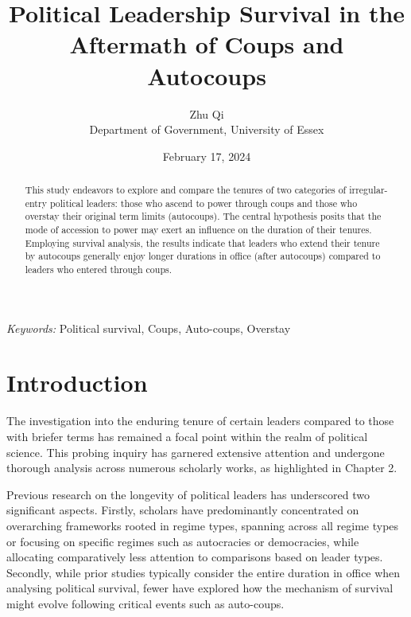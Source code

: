 \documentclass[
  12pt,
  a4paper,
  12pt]{article}
\begin{document}
\def\spacingset#1{\renewcommand{\baselinestretch}%
{#1}\small\normalsize} \spacingset{1}



\date{February 17, 2024}
\title{\bf Political Leadership Survival in the Aftermath of Coups and
Autocoups}
\author{
Zhu Qi\\
Department of Government, University of Essex\\
}
\maketitle

\bigskip
\bigskip
\begin{abstract}
This study endeavors to explore and compare the tenures of two
categories of irregular-entry political leaders: those who ascend to
power through coups and those who overstay their original term limits
(autocoups). The central hypothesis posits that the mode of accession to
power may exert an influence on the duration of their tenures. Employing
survival analysis, the results indicate that leaders who extend their
tenure by autocoups generally enjoy longer durations in office (after
autocoups) compared to leaders who entered through coups.
\end{abstract}

\noindent%
{\it Keywords:} Political survival, Coups, Auto-coups, Overstay
\vfill

\newpage
\spacingset{1.9} %

\section{Introduction}\label{introduction}

The investigation into the enduring tenure of certain leaders compared
to those with briefer terms has remained a focal point within the realm
of political science. This probing inquiry has garnered extensive
attention and undergone thorough analysis across numerous scholarly
works, as highlighted in Chapter 2.

Previous research on the longevity of political leaders has underscored
two significant aspects. Firstly, scholars have predominantly
concentrated on overarching frameworks rooted in regime types, spanning
across all regime types or focusing on specific regimes such as
autocracies or democracies, while allocating comparatively less
attention to comparisons based on leader types. Secondly, while prior
studies typically consider the entire duration in office when analysing
political survival, fewer have explored how the mechanism of survival
might evolve following critical events such as auto-coups.
\end{document}
